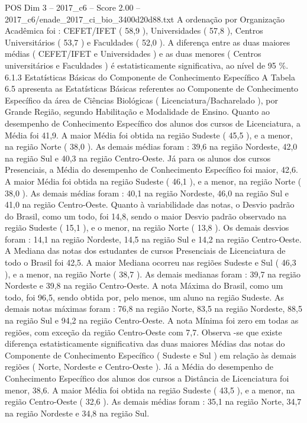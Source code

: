 \begin{textsample}{POS Dim 3 – 2017\_c6 – Score 2.00 – 2017\_c6/enade\_2017\_ci\_bio\_3400d20d88.txt}
A ordenação por Organização Acadêmica foi : CEFET/IFET ( 58,9 ), Universidades ( 57,8 ), Centros Universitários ( 53,7 ) e Faculdades ( 52,0 ).
A diferença entre as duas maiores médias ( CEFET/IFET e Universidades ) e as duas menores ( Centros universitários e Faculdades ) é estatisticamente significativa, ao nível de 95 \%. 6.1.3 Estatísticas Básicas do Componente de Conhecimento Específico A Tabela 6.5 apresenta as Estatísticas Básicas referentes ao Componente de Conhecimento Específico da área de Ciências Biológicas ( Licenciatura/Bacharelado ), por Grande Região, segundo Habilitação e Modalidade de Ensino.
Quanto ao desempenho de Conhecimento Específico dos alunos dos cursos de Licenciatura, a Média foi 41,9.
A maior Média foi obtida na região Sudeste ( 45,5 ), e a menor, na região Norte ( 38,0 ).
As demais médias foram : 39,6 na região Nordeste, 42,0 na região Sul e 40,3 na região Centro-Oeste.
Já para os alunos dos cursos Presenciais, a Média do desempenho de Conhecimento Específico foi maior, 42,6.
A maior Média foi obtida na região Sudeste ( 46,1 ), e a menor, na região Norte ( 38,0 ).
As demais médias foram : 40,1 na região Nordeste, 46,0 na região Sul e 41,0 na região Centro-Oeste.
Quanto à variabilidade das notas, o Desvio padrão do Brasil, como um todo, foi 14,8, sendo o maior Desvio padrão observado na região Sudeste ( 15,1 ), e o menor, na região Norte ( 13,8 ).
Os demais desvios foram : 14,1 na região Nordeste, 14,5 na região Sul e 14,2 na região Centro-Oeste.
A Mediana das notas dos estudantes de cursos Presenciais de Licenciatura de todo o Brasil foi 42,5.
A maior Mediana ocorreu nas regiões Sudeste e Sul ( 46,3 ), e a menor, na região Norte ( 38,7 ).
As demais medianas foram : 39,7 na região Nordeste e 39,8 na região Centro-Oeste.
A nota Máxima do Brasil, como um todo, foi 96,5, sendo obtida por, pelo menos, um aluno na região Sudeste.
As demais notas máximas foram : 76,8 na região Norte, 83,5 na região Nordeste, 88,5 na região Sul e 94,2 na região Centro-Oeste.
A nota Mínima foi zero em todas as regiões, com exceção da região Centro-Oeste com 7,7.
Observa -se que existe diferença estatisticamente significativa das duas maiores Médias das notas do Componente de Conhecimento Específico ( Sudeste e Sul ) em relação às demais regiões ( Norte, Nordeste e Centro-Oeste ).
Já a Média do desempenho de Conhecimento Específico dos alunos dos cursos a Distância de Licenciatura foi menor, 38,6.
A maior Média foi obtida na região Sudeste ( 43,5 ), e a menor, na região Centro-Oeste ( 32,6 ).
As demais médias foram : 35,1 na região Norte, 34,7 na região Nordeste e 34,8 na região Sul.

\end{textsample}
